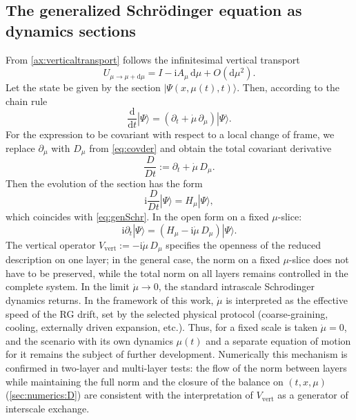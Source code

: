 \documentclass[11pt,a4paper]{article}
\newcommand{\ii}{\mathrm{i}}
\newcommand{\dd}{\mathrm{d}}
\theoremstyle{definition}
\theoremstyle{plain}
\theoremstyle{remark}
\begin{document}
\subsection{The generalized Schrödinger equation as dynamics sections}
\label{sec:derivations:sch}

From \cref{ax:verticaltransport} follows the infinitesimal vertical transport
\begin{equation}\label{eq:deriv_Umu}
U_{\mu\to\mu+\dd\mu}=I-\ii A_\mu\,\dd\mu+O(\dd\mu^2).
\end{equation}
Let the state be given by the section $|\Psi(x,\mu(t),t)\rangle$. Then, according to the chain rule
\begin{equation}\label{eq:deriv_chain}
\frac{\dd}{\dd t}|\Psi\rangle = \left(\partial_t + \dot\mu\,\partial_\mu\right)|\Psi\rangle.
\end{equation}
For the expression to be covariant with respect to a local change of frame, we replace $\partial_\mu$ with $D_\mu$
from \cref{eq:covder} and obtain the total covariant derivative
\begin{equation}\label{eq:deriv_Dt}
\frac{D}{Dt}:=\partial_t+\dot\mu\,D_\mu.
\end{equation}
Then the evolution of the section has the form
\begin{equation}\label{eq:deriv_genSch}
\ii\frac{D}{Dt}|\Psi\rangle=H_\mu|\Psi\rangle,
\end{equation}
which coincides with \cref{eq:genSchr}. In the open form on a fixed $\mu$-slice:
\begin{equation}\label{eq:deriv_genSch_open}
\ii\partial_t|\Psi\rangle = \left(H_\mu-\ii\dot\mu\,D_\mu\right)|\Psi\rangle.
\end{equation}
The vertical operator $V_{\mathrm{vert}}:=-\ii\dot\mu\,D_\mu$ specifies the openness of the reduced description on one layer;
in the general case, the norm on a fixed $\mu$-slice does not have to be preserved, while the total norm on all layers
remains controlled in the complete system. In the limit $\dot\mu\to 0$, the standard intrascale
Schrodinger dynamics returns.
In the framework of this work, $\dot\mu$ is interpreted as the effective speed of the RG drift,
set by the selected physical protocol (coarse-graining, cooling, externally driven expansion, etc.).
Thus, for a fixed scale is taken $\dot\mu=0$, and the scenario with its own dynamics $\mu(t)$
and a separate equation of motion for it remains the subject of further development.
Numerically this mechanism is confirmed in two-layer and multi-layer tests:
the flow of the norm between layers while maintaining the full norm and the closure of the balance on $(t,x,\mu)$
(\cref{sec:numerics:D}) are consistent with the interpretation of $V_{\mathrm{vert}}$ as a generator of interscale exchange.
\end{document}
